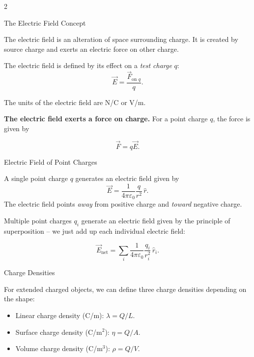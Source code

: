 \documentclass{summarysheet}
\begin{document}

\begin{multicols}{2}

\begin{topicbox}{The Electric Field Concept}

\noindent The electric field is an alteration of space surrounding charge. It is created by source charge and exerts an electric force on other charge.

The electric field is defined by its effect on a \emph{test charge} $q$:
\[
\vec{E} = \frac{\vec{F}_\text{on $q$}}{q}.
\]

The units of the electric field are N/C or V/m.

\textbf{The electric field exerts a force on charge.}  For a point charge $q$, the force is given by
\begin{teqbox}
\[
\vec{F} = q\vec{E}.
\]
\end{teqbox}

\end{topicbox}


\begin{topicbox}{Electric Field of Point Charges}

\noindent A single point charge $q$ generates an electric field given by
\[
\vec{E} = \frac{1}{4\pi \varepsilon_0 } \frac{q}{r^2} \, \hat{r}.
\]
The electric field points \emph{away} from positive charge and \emph{toward} negative charge.

Multiple point charges $q_i$ generate an electric field given by the principle of superposition -- we just add up each individual electric field:
\begin{teqbox}
\[
\vec{E}_\text{net} = \sum_i \frac{1}{4\pi \varepsilon_0 } \frac{q_i}{r_i^2} \, \hat{r}_i.
\]
\end{teqbox}

\end{topicbox}


\begin{topicbox}{Charge Densities}

\noindent For extended charged objects, we can define three charge densities depending on the shape:
\begin{teqbox}
\begin{itemize}
\item Linear charge density (C/m):  $\lambda = Q/L$.
\item Surface charge density (C/m$^2$): $\eta = Q/A$.
\item Volume charge density (C/m$^3$): $\rho = Q/V$.
\end{itemize}
\end{teqbox}


\end{topicbox}
\end{multicols}
\end{document}
